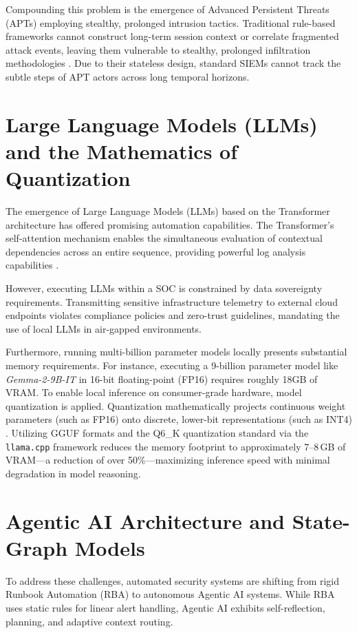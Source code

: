 Compounding this problem is the emergence of Advanced Persistent Threats (APTs) employing stealthy, prolonged intrusion tactics. Traditional rule-based frameworks cannot construct long-term session context or correlate fragmented attack events, leaving them vulnerable to stealthy, prolonged infiltration methodologies \cite{apt_stealth2021}. Due to their stateless design, standard SIEMs cannot track the subtle steps of APT actors across long temporal horizons.

\section{Large Language Models (LLMs) and the Mathematics of Quantization}

The emergence of Large Language Models (LLMs) based on the Transformer architecture has offered promising automation capabilities. The Transformer’s self-attention mechanism enables the simultaneous evaluation of contextual dependencies across an entire sequence, providing powerful log analysis capabilities \cite{vaswani2017}.

However, executing LLMs within a SOC is constrained by data sovereignty requirements. Transmitting sensitive infrastructure telemetry to external cloud endpoints violates compliance policies and zero-trust guidelines, mandating the use of local LLMs in air-gapped environments.

Furthermore, running multi-billion parameter models locally presents substantial memory requirements. For instance, executing a 9-billion parameter model like \textit{Gemma-2-9B-IT} in 16-bit floating-point (FP16) requires roughly 18GB of VRAM. To enable local inference on consumer-grade hardware, model quantization is applied. Quantization mathematically projects continuous weight parameters (such as FP16) onto discrete, lower-bit representations (such as INT4) \cite{quantization2021}. Utilizing GGUF formats and the Q6\_K quantization standard via the \texttt{llama.cpp} framework reduces the memory footprint to approximately 7--8\,GB of VRAM---a reduction of over 50\%---maximizing inference speed with minimal degradation in model reasoning.

\section{Agentic AI Architecture and State-Graph Models}

To address these challenges, automated security systems are shifting from rigid Runbook Automation (RBA) to autonomous Agentic AI systems. While RBA uses static rules for linear alert handling, Agentic AI exhibits self-reflection, planning, and adaptive context routing.

